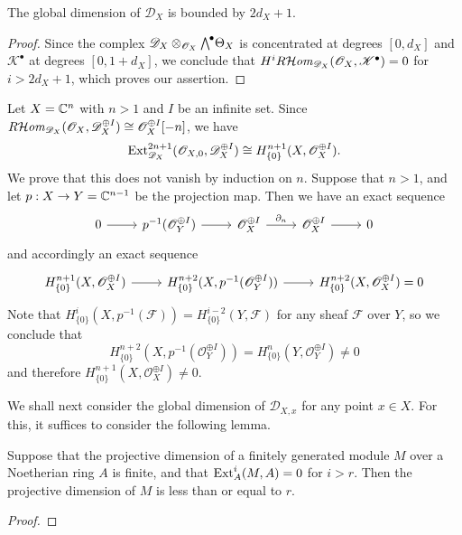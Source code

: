 \begin{theorem}\label{D-module global dimension 2n+1}
The global dimension of $\mathscr{D}_X$ is bounded by $2d_X+1$.
\end{theorem}
\begin{proof}
Since the complex $\mathscr{D}_X\otimes_{\mathscr{O}_X}\bigw^\bullet\Theta_X$ is concentrated at degrees $[0,d_X]$ and $\mathscr{K}^\bullet$ at degrees $[0,1+d_X]$, we conclude that $H^iR\!\operatorname{\mathcal{H}\hspace*{-0.4pt}\textit{om}\hspace{0.5pt}}_{\mathscr{D}_X}(\mathscr{O}_X,\mathscr{K}^\bullet)=0$ for $i>2d_X+1$, which proves our assertion.
\end{proof}

\begin{remark}
Let $X=\mathbb{C}^n$ with $n>1$ and $I$ be an infinite set. Since $R\!\operatorname{\mathcal{H}\hspace*{-0.4pt}\textit{om}\hspace{0.5pt}}_{\mathscr{D}_X}(\mathscr{O}_X,\mathscr{D}_X^{\oplus I})\cong\mathscr{O}_X^{\oplus I}[-n]$, we have
\[\mathrm{Ext}_{\mathscr{D}_X}^{2n+1}(\mathscr{O}_{X,0},\mathscr{D}_X^{\oplus I})\cong H_{\{0\}}^{n+1}(X,\mathscr{O}_X^{\oplus I}).\]
We prove that this does not vanish by induction on $n$. Suppose that $n>1$, and let $p:X\to Y=\mathbb{C}^{n-1}$ be the projection map. Then we have an exact sequence
\[\begin{tikzcd}
0\ar[r]&p^{-1}(\mathscr{O}_Y^{\oplus I})\ar[r]&\mathscr{O}_X^{\oplus I}\ar[r,"\partial_n"]&\mathscr{O}_X^{\oplus I}\ar[r]&0
\end{tikzcd}\]
and accordingly an exact sequence
\[\begin{tikzcd}
H_{\{0\}}^{n+1}(X,\mathscr{O}_X^{\oplus I})\ar[r]&H_{\{0\}}^{n+2}(X,p^{-1}(\mathscr{O}_Y^{\oplus I}))\ar[r]&H_{\{0\}}^{n+2}(X,\mathscr{O}_X^{\oplus I})=0
\end{tikzcd}\]
Note that $H^i_{\{0\}}(X,p^{-1}(\mathscr{F}))=H^{i-2}_{\{0\}}(Y,\mathscr{F})$ for any sheaf $\mathscr{F}$ over $Y$, so we conclude that
\[H^{n+2}_{\{0\}}(X,p^{-1}(\mathscr{O}_Y^{\oplus I}))=H^n_{\{0\}}(Y,\mathscr{O}_Y^{\oplus I})\neq 0\]
and therefore $H^{n+1}_{\{0\}}(X,\mathscr{O}_X^{\oplus I})\neq 0$.
\end{remark}

We shall next consider the global dimension of $\mathscr{D}_{X,x}$ for any point $x\in X$. For this, it suffices to consider the following lemma.
\begin{lemma}\label{Noe ring finite module projdim finite if Ext bounded}
Suppose that the projective dimension of a finitely generated module $M$ over a Noetherian ring $A$ is finite, and that $\mathrm{Ext}_A^i(M,A)=0$ for $i>r$. Then the projective dimension of $M$ is less than or equal to $r$.
\end{lemma}
\begin{proof}

\end{proof}

